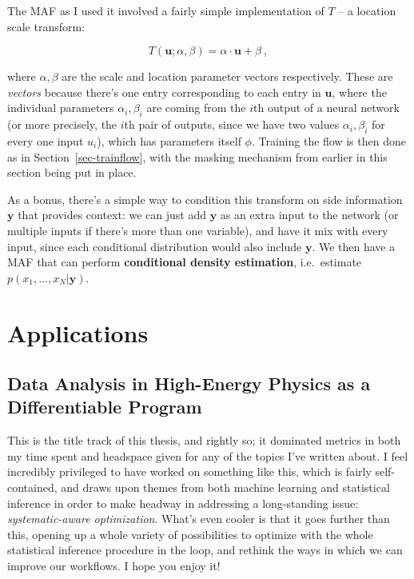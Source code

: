 \documentclass[
  11pt,
  numbers=noendperiod]{book}
\begin{document}
The MAF as I used it involved a fairly simple implementation of \(T\) --
a location scale transform:

\[
T(\mathbf{u}; \alpha, \beta) = \alpha \cdot \mathbf{u} + \beta~,
\]

where \(\alpha, \beta\) are the scale and location
parameter vectors respectively. These are \emph{vectors} because there's
one entry corresponding to each entry in \(\mathbf{u}\), where the
individual parameters \(\alpha_i, \beta_i\) are coming from the \(i\)th
output of a neural network (or more precisely, the \(i\)th pair of
outputs, since we have two values \(\alpha_i, \beta_i\) for every one
input \(u_i\)), which has parameters itself \(\phi\). Training the flow
is then done as in Section~\ref{sec-trainflow}, with the masking
mechanism from earlier in this section being put in place.

As a bonus, there's a simple way to condition this transform on side
information \(\mathbf{y}\) that provides context: we can just add
\(\mathbf{y}\) as an extra input to the network (or multiple inputs if
there's more than one variable), and have it mix with every input, since
each conditional distribution would also include \(\mathbf{y}\). We then
have a MAF that can perform \textbf{conditional density estimation},
i.e.~estimate \(p(x_1, \dots, x_N| \mathbf{y})\).

\part{Applications}

\hypertarget{data-analysis-in-high-energy-physics-as-a-differentiable-program}{%
\chapter{Data Analysis in High-Energy Physics as a Differentiable
Program}\label{data-analysis-in-high-energy-physics-as-a-differentiable-program}}

This is the title track of this thesis, and rightly so; it dominated
metrics in both my time spent and headspace given for any of the topics
I've written about. I feel incredibly privileged to have worked on
something like this, which is fairly self-contained, and draws upon
themes from both machine learning and statistical inference in order to
make headway in addressing a long-standing issue: \emph{systematic-aware
optimization}. What's even cooler is that it goes further than this,
opening up a whole variety of possibilities to optimize with the whole
statistical inference procedure in the loop, and rethink the ways in
which we can improve our workflows. I hope you enjoy it!
\end{document}

